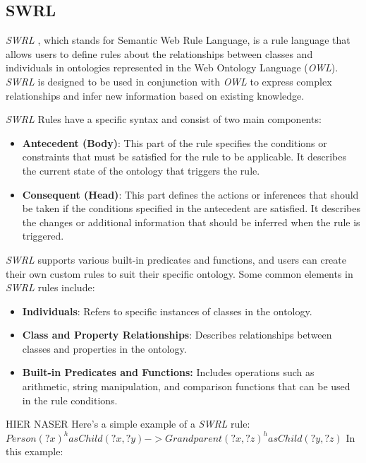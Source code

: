 	\subsection{SWRL}
	\label{sec:SWRL}
	\textit{SWRL} \cite{Horrocks2004}, which stands for Semantic Web Rule Language, is a rule language that allows users to define rules about the relationships between classes and individuals in ontologies represented in the Web Ontology Language (\textit{OWL}). \textit{SWRL} \cite{Horrocks2004} is designed to be used in conjunction with \textit{OWL} to express complex relationships and infer new information based on existing knowledge.

	\textit{SWRL} \cite{Horrocks2004} Rules have a specific syntax and consist of two main components:
	\begin{itemize}
		\item \textbf{Antecedent (Body)}: This part of the rule specifies the conditions or constraints that must be satisfied for the rule to be applicable. It describes the current state of the ontology that triggers the rule.
		\item \textbf{Consequent (Head)}: This part defines the actions or inferences that should be taken if the conditions specified in the antecedent are satisfied. It describes the changes or additional information that should be inferred when the rule is triggered.
	\end{itemize}
	\textit{SWRL} \cite{Horrocks2004} supports various built-in predicates and functions, and users can create their own custom rules to suit their specific ontology. Some common elements in \textit{SWRL} \cite{Horrocks2004} rules include:
	\begin{itemize}
		\item \textbf{Individuals}: Refers to specific instances of classes in the ontology.
		\item \textbf{Class and Property Relationships}: Describes relationships between classes and properties in the ontology.
		\item \textbf{Built-in Predicates and Functions:} Includes operations such as arithmetic, string manipulation, and comparison functions that can be used in the rule conditions.
	\end{itemize}

	HIER NASER
	Here's a simple example of a \textit{SWRL} \cite{Horrocks2004} rule:
	\newline
	$Person(?x) ^ hasChild(?x, ?y) -> Grandparent(?x, ?z) ^ hasChild(?y, ?z)$
	\newline
	In this example:

